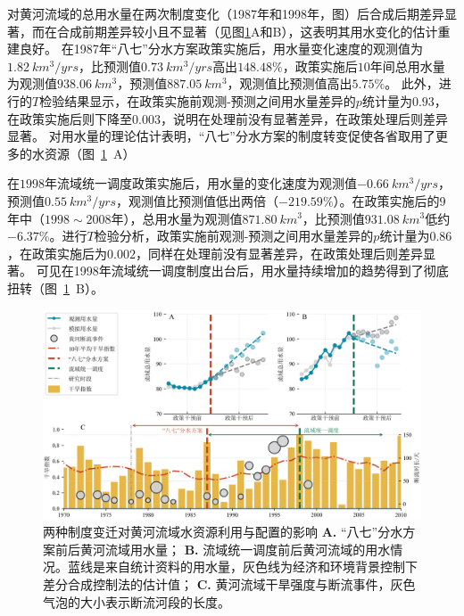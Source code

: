 对黄河流域的总用水量在两次制度变化（1987年和1998年，图）后合成后期差异显著，而在合成前期差异较小且不显著（见图\ref{ch5:fig:main_results}A和B），这表明其用水变化的估计重建良好。
在1987年“八七”分水方案政策实施后，用水量变化速度的观测值为$1.82~km^3/yrs$，比预测值$0.73~km^3/yrs$高出$148.48\%$，政策实施后$10$年间总用水量为观测值$938.06~km^3$，预测值$887.05~km^3$，观测值比预测值高出$5.75\%$。
此外，进行的$T$检验结果显示，在政策实施前观测-预测之间用水量差异的$p$统计量为$0.93$，在政策实施后则下降至$0.003$，说明在处理前没有显著差异，在政策处理后则差异显著。
对用水量的理论估计表明，“八七”分水方案的制度转变促使各省取用了更多的水资源（图~\ref{ch5:fig:main_results}~A）

在$1998$年流域统一调度政策实施后，用水量的变化速度为观测值$-0.66~km^3/yrs$，预测值$0.55~km^3/yrs$，观测值比预测值低出两倍（$-219.59\%$）。在政策实施后的$9$年中（$1998 \sim 2008$年），总用水量为观测值$871.80~km^3$，比预测值$931.08~km^3$低约$-6.37\%$。进行$T$检验分析，政策实施前观测-预测之间用水量差异的$p$统计量为$0.86$，在政策实施后为$0.002$，同样在处理前没有显著差异，在政策处理后则差异显著。
可见在1998年流域统一调度制度出台后，用水量持续增加的趋势得到了彻底扭转（图~\ref{ch5:fig:main_results}~B）。

\begin{figure}[!htb]
	\centering
	\includegraphics[width=\linewidth]{img/ch5/ch5_results.png}
	\caption[两种制度变迁对黄河流域水资源利用与配置的影响]{
        两种制度变迁对黄河流域水资源利用与配置的影响
        \textbf{A.} “八七”分水方案前后黄河流域用水量；
        \textbf{B.} 流域统一调度前后黄河流域的用水情况。蓝线是来自统计资料的用水量，灰色线为经济和环境背景控制下差分合成控制法的估计值；
        \textbf{C.} 黄河流域干旱强度与断流事件，灰色气泡的大小表示断流河段的长度。
	}\label{ch5:fig:main_results}
\end{figure}


